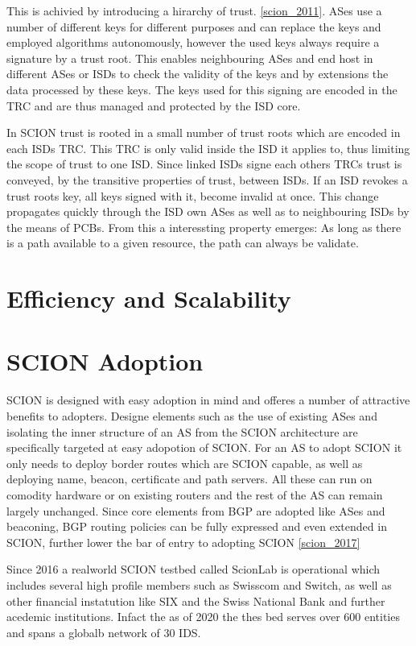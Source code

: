 \documentclass[../eva1_scion.tex]{subfiles}
\begin{document}
    This is achivied by introducing a hirarchy of trust. \ref{scion_2011}. ASes use a number of different keys for different purposes and can replace the keys and employed algorithms autonomously, however the used keys always require a signature by a trust root. This enables neighbouring ASes and end host in different ASes or ISDs to check the validity of the keys and by extensions the data processed by these keys. The keys used for this signing are encoded in the TRC and are thus managed and protected by the ISD core.

    In SCION trust is rooted in a small number of trust roots which are encoded in each ISDs TRC. This TRC is only valid inside the ISD it applies to, thus limiting the scope of trust to one ISD. Since linked ISDs signe each others TRCs trust is conveyed, by the transitive properties of trust, between ISDs. If an ISD revokes a trust roots key, all keys signed with it, become invalid at once. This change propagates quickly through the ISD own ASes as well as to neighbouring ISDs by the means of PCBs. From this a interessting property emerges: As long as there is a path available to a given resource, the path can always be validate.

    \section{Efficiency and Scalability}

    \section{SCION Adoption}
    SCION is designed with easy adoption in mind and offeres a number of attractive benefits to adopters. Designe elements such as the use of existing ASes and isolating the inner structure of an AS from the SCION architecture are specifically targeted at easy adopotion of SCION. For an AS to adopt SCION it only needs to deploy border routes which are SCION capable, as well as deploying name, beacon, certificate and path servers. All these can run on comodity hardware or on existing routers and the rest of the AS can remain largely unchanged. Since core elements from BGP are adopted like ASes and beaconing, BGP routing policies can be fully expressed and even extended in SCION, further lower the bar of entry to adopting SCION \ref{scion_2017}

    Since 2016 a realworld SCION testbed called ScionLab is operational \cite{testbed_2020} which includes several high profile members such as Swisscom and Switch, as well as other financial instatution like SIX and the Swiss National Bank \cite{snb} and further acedemic institutions. Infact the as of 2020 the thes bed serves over 600 entities and spans a globalb network of 30 IDS.
\end{document}
